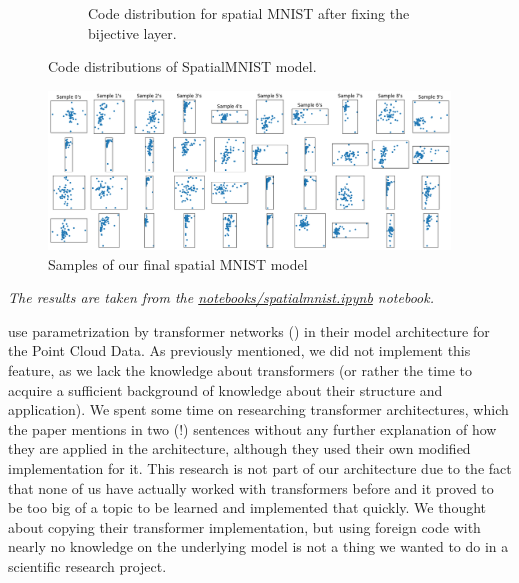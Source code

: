 \begin{figure}[p]
\begin{subfigure}[t]{.48\textwidth}
    \caption{Code distribution for spatial MNIST after fixing the bijective layer.}
    \label{fig:spatial_mnist_code_after}
\end{subfigure}
\caption{Code distributions of SpatialMNIST model.}
\end{figure}

\begin{figure}[p]
    \centering
\includegraphics[width=0.95\textwidth]{images/spatial_mnist/after_bij_layer_fix/samples no ticks.png}
    \caption{Samples of our final spatial MNIST model}
    \label{fig:spatial_mnist_samples}
\end{figure}

\textit{The results are taken from the \href{https://github.com/xiaoxiae/GNNFinal2024/blob/main/notebooks/spatial_mnist.ipynb}{notebooks/spatial\textunderscore mnist.ipynb} notebook.}

\cite{nielsen2020survae} use parametrization by transformer networks (\cite{vaswani2023attention}) in their model architecture for the Point Cloud Data. As previously mentioned, we did not implement this feature, as we lack the knowledge about transformers (or rather the time to acquire a sufficient background of knowledge about their structure and application). We spent some time on researching transformer architectures, which the paper mentions in two (!) sentences without any further explanation of how they are applied in the architecture, although they used their own modified implementation for it. This research is not part of our architecture due to the fact that none of us have actually worked with transformers before and it proved to be too big of a topic to be learned and implemented that quickly. We thought about copying their transformer implementation, but using foreign code with nearly no knowledge on the underlying model is not a thing we wanted to do in a scientific research project.


